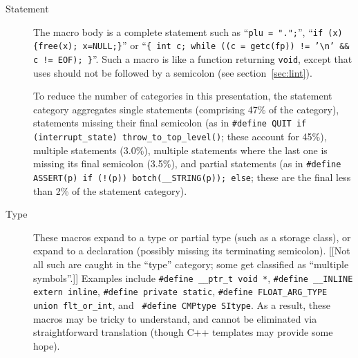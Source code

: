 \begin{description}
\item[Statement]\label{item:statement-category}
  The macro body is a complete statement such as
  ``{\tt plu = ".";}'', ``{\tt if (x) \verb|{|free(x); x=NULL;\verb|}|}'' or
    ``{\tt \verb|{| int c; while ((c = getc(fp)) != '\verb|\|n' \verb|&&| c != EOF);
    \verb|}|}''.  Such a macro is like a function 
    returning {\tt void}, except that uses should not be followed by a
    semicolon (see section~\ref{sec:lint}).
    
    To reduce the number of categories in this presentation, the statement
    category aggregates single statements (comprising 47\% of the category),
    statements missing their final semicolon (as in {\tt \#define QUIT if
    (\verb|interrupt_state|) \verb|throw_to_top_level|()}; these account
  for 45\%), multiple statements (3.0\%), multiple statements where the
  last one is missing its final semicolon (3.5\%), and partial statements
  (as in {\tt \#define ASSERT(p) if (!(p)) botch(\verb|__STRING|(p));
  else}; these are the final less than 2\% of the statement category).

\item[Type] 
  These macros expand to a type or partial type (such as a storage class),
  or expand to a declaration (possibly missing its terminating semicolon).
  [[Not all such are caught in the ``type'' category; some get classified
  as ``multiple symbols''.]]  Examples include {\tt \#define \verb|__ptr_t|
  void *}, {\tt \#define \verb|__INLINE| extern inline}, {\tt \#define
private static}, {\tt \#define \verb|FLOAT_ARG_TYPE| union \verb|flt_or_int|}, and {\tt
\#define CMPtype SItype}.  As a result, these macros may be tricky to
understand, and cannot be eliminated via straightforward translation
(though C++ templates may provide some hope).




\end{description}
